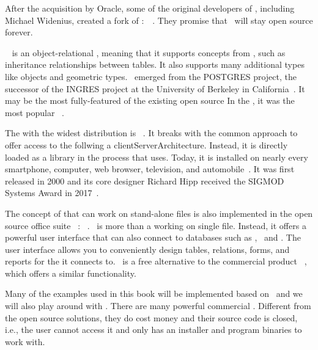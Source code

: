 After the acquisition by Oracle, some of the original developers of \mysql, including Michael Widenius, created a fork of \mysql:~\mariadb~\cite{R2014MM,B2019LTMEELFFSAA,D2015LMAM,AA2018QAWMV1ITSQ,AA2018QAWMV2IDQ}.
They promise that \mariadb\ will stay open source forever.

\postgresql~\cite{TA2024DDAMWPAM,FP2023LP,OH2017PUAR,B2024PELUYDW} is an object-relational , meaning that it supports concepts from , such as inheritance relationships between tables.
It also supports many additional types like  objects and geometric types.
\postgresql\ emerged from the POSTGRES project, the successor of the INGRES project at the University of Berkeley in California~\cite{C20245YOQ}.
It may be the most fully-featured of the existing open source  
In the , it was the most popular ~\cite{SE:SO:2024DS}.

The   with the widest distribution is \sqlite~\cite{WB2019RHSOOS,GPBHKP2022SPPAF,C20245YOQ,HWACIS:HO2023WKUOS}.
It breaks with the common approach to offer access to the  follwing a \gls{clientServerArchitecture}.
Instead, it is directly loaded as a library in the process that uses.
Today, it is installed on nearly every smartphone, computer, web browser, television, and automobile~\cite{WB2019RHSOOS,GPBHKP2022SPPAF,C20245YOQ}.
It was first released in 2000 and its core designer Richard Hipp received the SIGMOD Systems Award in 2017~\cite{C20245YOQ}.

The concept of  that can work on stand-alone files is also implemented in the open source office suite \libreoffice~\cite{DF2024LTDF,GL2012LTSOOSSCBAFACSOL,S2022L7PFEUU}: \libreofficeBase~\cite{FNFHWSKLSSGLFRSRPLJG2022BG7R1BOL7C,S2022L7PFEUU}.
\libreofficeBase\ is more than a  working on single file.
Instead, it offers a powerful user interface that can also connect to databases such as \mysql, \mariadb\ and \postgresql.
The user interface allows you to conveniently design tables, relations, forms, and reports for the  it connects to.
\libreofficeBase\ is a free alternative to the commercial product \microsoftAccess~\cite{SSI2023MA2BTA,B2020HOMA2,UC2021AFD}, which offers a similar functionality.

Many of the examples used in this book will be implemented based on \postgresql\ and we will also play around with \libreofficeBase.%
%
\endhsection%
%
%
%
There are many powerful commercial .
Different from the open source solutions, they do cost money and their source code is closed, i.e., the user cannot access it and only has an installer and program binaries to work with.

